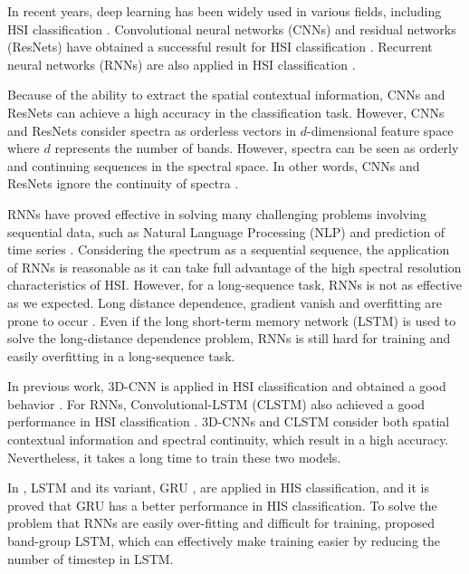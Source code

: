 \documentclass[conference]{IEEEtran}
\begin{document}
In recent years, deep learning has been widely used in various fields, including HSI
classification \cite{zhu2017deep}. Convolutional neural networks (CNNs) and residual
networks (ResNets) have obtained a successful result for HSI classification
\cite{lee2017going, zhong2017deep}. Recurrent neural networks (RNNs) are also applied
in HSI classification \cite{mou2017deep}.

Because of the ability to extract the spatial contextual information, CNNs and ResNets
can achieve a high accuracy in the classification task. However, CNNs and ResNets
consider spectra as orderless vectors in $d$-dimensional feature space where $d$
represents the number of bands. However, spectra can be seen as orderly and continuing
sequences in the spectral space. In other words, CNNs and ResNets ignore the continuity
of spectra \cite{mou2017deep}.

RNNs have proved effective in solving many challenging problems involving sequential
data, such as Natural Language Processing (NLP) \cite{sundermeyer2015feedforward} and
prediction of time series \cite{gers2002applying}. Considering the spectrum as a
sequential sequence, the application of RNNs is reasonable as it can take full
advantage of the high spectral resolution characteristics of HSI. However, for a
long-sequence task, RNNs is not as effective as we expected. Long distance dependence,
gradient vanish and overfitting are prone to occur \cite{bengio1994learning}. Even if
the long short-term memory network (LSTM) \cite{williams1989learning} is used to solve
the long-distance dependence problem, RNNs is still hard for training and easily
overfitting in a long-sequence task.

In previous work, 3D-CNN is applied in HSI classification and obtained a good behavior
\cite{li2017spectral, zhong2018spectral}. For RNNs, Convolutional-LSTM (CLSTM)
\cite{xingjian2015convolutional} also achieved a good performance in HSI classification
\cite{liu2017bidirectional}. 3D-CNNs and CLSTM consider both spatial contextual
information and spectral continuity, which result in a high accuracy. Nevertheless,
it takes a long time to train these two models.

In \cite{mou2017deep}, LSTM and its variant, GRU \cite{yao2015depth}, are applied in
HIS classification, and it is proved that GRU has a better performance in HIS
classification. To solve the problem that RNNs are easily over-fitting and difficult
for training, \cite{xu2017band} proposed band-group LSTM, which can effectively make
training easier by reducing the number of timestep in LSTM.
\end{document}
